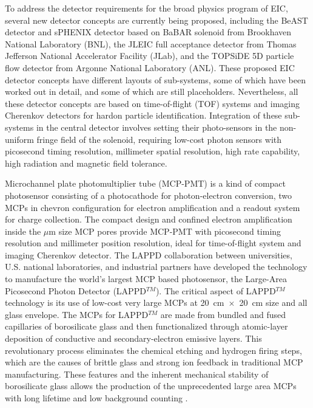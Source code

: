 \documentclass[preprint,5p]{elsarticle}
\begin{document}
To address the detector requirements for the broad physics program of EIC, 
several new detector concepts are currently being proposed, including the BeAST 
detector \cite{3} and sPHENIX detector based on BaBAR solenoid \cite{4} from 
Brookhaven National Laboratory (BNL), the JLEIC full acceptance detector 
\cite{5} from Thomas Jefferson National Accelerator Facility (JLab), and the 
TOPSiDE 5D particle flow detector \cite{6} from Argonne National Laboratory 
(ANL).  These proposed EIC detector concepts have different layouts of 
sub-systems, some of which have been worked out in detail, and some of which 
are still placeholders.  Nevertheless, all these detector concepts are based on 
time-of-flight (TOF) systems and imaging Cherenkov detectors for hardon 
particle identification.  Integration of these sub-systems in the central 
detector involves setting their photo-sensors in the non-uniform fringe field 
of the solenoid, requiring low-cost photon sensors with picosecond timing 
resolution, millimeter spatial resolution, high rate capability, high radiation 
and magnetic field tolerance.

Microchannel plate photomultiplier tube (MCP-PMT) \cite{7} is a kind of compact 
photosensor consisting of a photocathode for photon-electron conversion, two 
MCPs in chevron configuration for electron amplification and a readout system 
for charge collection. The compact design and confined electron amplification 
inside the $\mu$m size MCP pores provide MCP-PMT with picosecond timing 
resolution and millimeter position resolution, ideal for time-of-flight system 
and imaging Cherenkov detector. The LAPPD collaboration \cite{8} between 
universities, U.S.  national laboratories, and industrial partners have 
developed the technology to manufacture the world’s largest MCP based 
photosensor, the Large-Area Picosecond Photon Detector (LAPPD$^{TM}$). The 
critical aspect of LAPPD$^{TM}$ technology is its use of low-cost very large 
MCPs \cite{9} at 20~cm~$\times$~20~cm size and all glass envelope. The MCPs for 
LAPPD$^{TM}$ are made from bundled and fused capillaries of borosilicate glass 
and then functionalized through atomic-layer deposition \cite{10,11,12} of 
conductive and secondary-electron emissive layers.  This revolutionary process 
eliminates the chemical etching and hydrogen firing steps, which are the causes 
of brittle glass and strong ion feedback in traditional MCP manufacturing.  
These features and the inherent mechanical stability of borosilicate glass 
allows the production of the unprecedented large area MCPs with long lifetime 
\cite{13} and low background counting \cite{14}. 
\end{document}
